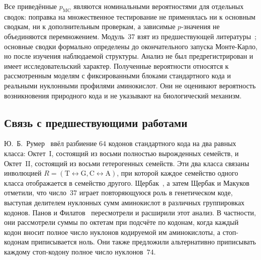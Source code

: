 \documentclass[11pt,a4paper]{article}
\renewcommand{\_}{\origunderscore\allowbreak}
\begin{document}
Все приведённые $p_{\mathrm{MC}}$ являются номинальными
вероятностями для отдельных сводок: поправка на множественное
тестирование не применялась ни к основным сводкам, ни к дополнительным
проверкам, а зависимые
$p$-значения не объединяются перемножением. Модуль~$37$ взят
из предшествующей литературы~\cite{shcherbak1993,shcherbak2003,makukov2013,panov2024}; основные сводки формально определены до
окончательного запуска Монте-Карло, но после изучения наблюдаемой
структуры. Анализ не был предрегистрирован и имеет
исследовательский характер. Полученные вероятности относятся
к рассмотренным моделям с фиксированными блоками стандартного кода и
реальными нуклонными профилями аминокислот. Они не оценивают
вероятность возникновения природного кода и не указывают
на биологический механизм.

\subsection{Связь с предшествующими работами}
\label{sec:discussion-prior-work}

Ю.~Б.~Румер~\cite{rumer1966,rumer1968}
ввёл разбиение $64$ кодонов стандартного кода на
два равных класса: Октет~I,
состоящий из восьми полностью вырожденных семейств, и
Октет~II, состоящий из восьми
гетерогенных семейств. Эти два класса связаны
инволюцией
$R = (\mathrm{T} \leftrightarrow \mathrm{G},
\mathrm{C} \leftrightarrow \mathrm{A})$, при которой
каждое семейство одного класса отображается в
семейство другого. Щербак~\cite{shcherbak1993,shcherbak2003}, а затем Щербак и Макуков~\cite{makukov2013}
отметили, что число~$37$ играет повторяющуюся роль
в генетическом коде, выступая делителем нуклонных сумм
аминокислот в различных группировках кодонов. Панов и
Филатов~\cite{panov2024} пересмотрели и расширили
этот анализ. В частности, они рассмотрели суммы по
октетам при подсчёте по кодонам, когда каждый кодон
вносит полное число нуклонов кодируемой им аминокислоты,
а стоп-кодонам приписывается ноль.
Они также предложили альтернативно приписывать каждому
стоп-кодону полное число нуклонов~$74$.
\end{document}
